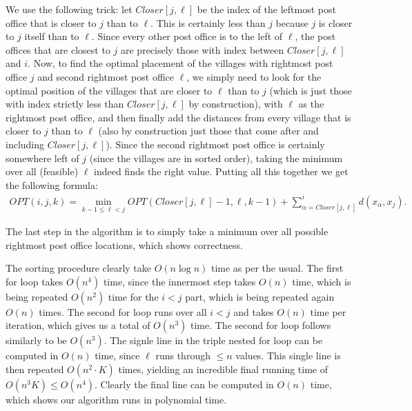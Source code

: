 \documentclass[12pt]{article}
\theoremstyle{definitionstyle}
\begin{document}
    We use the following trick: let $Closer[j,\ell]$ be the index of the leftmost post office that is closer to $j$ than to $\ell$. This is certainly less than $j$ because $j$ is closer to $j$ itself than to $\ell$. Since every other post office is to the left of $\ell$, the post offices that are closest to $j$ are precisely those with index between $Closer[j, \ell]$ and $i$. Now, to find the optimal placement of the villages with rightmost post office $j$ and second rightmost post office $\ell$, we simply need to look for the optimal position of the villages that are closer to $\ell$ than to $j$ (which is just those with index strictly less than $Closer[j,\ell]$ by construction), with $\ell$ as the rightmost post office, and then finally add the distances from every village that is closer to $j$ than to $\ell$ (also by construction just those that come after and including $Closer[j, \ell]$). Since the second rightmost post office is certainly somewhere left of $j$ (since the villages are in sorted order), taking the minimum over all (feasible) $\ell$ indeed finds the right value. Putting all this together we get the following formula:
    \begin{align*}
        OPT(i, j, k) = \min_{k-1 \leq \ell < j} OPT(Closer[j,\ell]-1, \ell, k-1) + \sum_{\alpha=Closer[j,\ell]}^i d(x_\alpha, x_j).
    \end{align*}

    The last step in the algorithm is to simply take a minimum over all possible rightmost post office locations, which shows correctness.

    The sorting procedure clearly take $O(n \log n)$ time as per the usual. The first for loop takes $O(n^4)$ time, since the innermost step takes $O(n)$ time, which is being repeated $O(n^2)$ time for the $i < j$ part, which is being repeated again $O(n)$ times. The second for loop runs over all $i < j$ and takes $O(n)$ time per iteration, which gives us a total of $O(n^3)$ time. The second for loop follows similarly to be $O(n^3)$. The signle line in the triple nested for loop can be computed in $O(n)$ time, since $\ell$ runs through $\leq n$ values. This single line is then repeated $O(n^2 \cdot K)$ times, yielding an incredible final running time of $O(n^3K) \leq O(n^4)$. Clearly the final line can be computed in $O(n)$ time, which shows our algorithm runs in polynomial time. 
\end{document}
